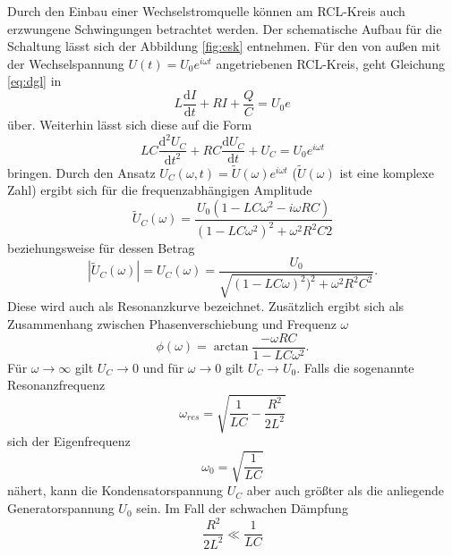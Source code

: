 Durch den Einbau einer Wechselstromquelle können am RCL-Kreis auch erzwungene Schwingungen 
betrachtet werden. Der schematische Aufbau für die Schaltung lässt sich der Abbildung \ref{fig:esk}
entnehmen. Für den von außen mit der Wechselspannung $U(t) = U_0 e^{i\omega t}$ angetriebenen 
RCL-Kreis, geht Gleichung \ref{eq:dgl} in 
\begin{equation}
    L \frac{\mathrm{d}I}{\mathrm{d}t} + RI + \frac{Q}{C} = U_0 e^{}
\end{equation}
\noindent über. Weiterhin lässt sich diese auf die Form
\begin{equation}
    LC \frac{\mathrm{d}^{2}U_C}{\mathrm{d}t^{2}} + RC \frac{\mathrm{d}U_C}{\mathrm{d}t} + U_C = U_0 e^{i\omega t}
\end{equation}
\noindent bringen. Durch den Ansatz $U_C(\omega,t) = \tilde{U}(\omega) e^{i\omega t}$ ($\tilde{U}(\omega)$ ist 
eine komplexe Zahl) ergibt sich 
für die frequenzabhängigen Amplitude 
\begin{equation}
    \tilde{U}_C(\omega) = \frac{U_0(1-LC\omega^{2}-i\omega RC)}{(1-LC \omega^{2})^{2} + \omega^{2}R^{2}C{2} }
\end{equation}
beziehungsweise für dessen Betrag
\begin{equation}
    |\tilde{U}_C(\omega)| = U_C(\omega)= \frac{U_0}{\sqrt{(1-LC\omega)^{2})^{2}+\omega^{2}R^{2}C^{2}}}.
\end{equation}
Diese wird auch als Resonanzkurve bezeichnet. Zusätzlich ergibt sich als Zusammenhang
zwischen Phasenverschiebung und Frequenz $\omega$
\begin{equation}
    \phi(\omega) = \arctan{\frac{-\omega RC}{1-LC \omega^{2}}}.
\end{equation}
\noindent
Für $\omega \rightarrow \infty$ gilt
$U_C \rightarrow 0$ und für $\omega \rightarrow 0$ gilt $U_C \rightarrow U_0$. Falls die 
sogenannte Resonanzfrequenz 
\begin{equation}
    \omega_{res} = \sqrt{\frac{1}{LC} - \frac{R^{2}}{2L^{2}}}
    \label{eq:res}
\end{equation}
\noindent 
sich der Eigenfrequenz 
\begin{equation}
    \omega_0 = \sqrt{\frac{1}{LC}}
\end{equation}
nähert, kann die Kondensatorspannung $U_C$ aber auch größter als die anliegende Generatorspannung
$U_0$ sein. Im Fall der schwachen Dämpfung
\begin{equation*}
    \frac{R^{2}}{2L^{2}} \ll \frac{1}{LC}
\end{equation*}
\noindent 
